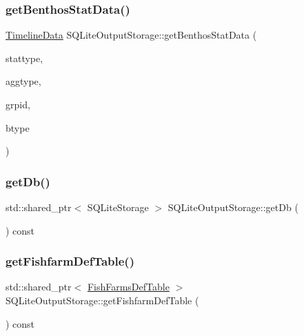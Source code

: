 \mbox{\label{class_s_q_lite_output_storage_aea0e285a8d0b0e3fc9ed095d8daef966}} 
\subsubsection{\texorpdfstring{getBenthosStatData()}{getBenthosStatData()}}
{\footnotesize\ttfamily \mbox{\hyperlink{struct_timeline_data}{Timeline\+Data}} S\+Q\+Lite\+Output\+Storage\+::get\+Benthos\+Stat\+Data (\begin{DoxyParamCaption}\item[{\mbox{\hyperlink{namespacedisplace_1_1plot_a3a91ceda6f3e5855d0e7cf97e8dea045}{displace\+::plot\+::\+Benthos\+Stat}}}]{stattype,  }\item[{\mbox{\hyperlink{namespacedisplace_1_1plot_a522cdc3da3faefae0803944b866e0c3d}{displace\+::plot\+::\+Aggregation\+Type}}}]{aggtype,  }\item[{int}]{grpid,  }\item[{const std\+::vector$<$ int $>$ \&}]{btype }\end{DoxyParamCaption})}

\mbox{\label{class_s_q_lite_output_storage_a0a4e7c7bdbb73b59a28991657768aa79}} 
\subsubsection{\texorpdfstring{getDb()}{getDb()}}
{\footnotesize\ttfamily std\+::shared\+\_\+ptr$<$ S\+Q\+Lite\+Storage $>$ S\+Q\+Lite\+Output\+Storage\+::get\+Db (\begin{DoxyParamCaption}{ }\end{DoxyParamCaption}) const}

\mbox{\label{class_s_q_lite_output_storage_a936436b2b0a76fa889c1193bc302c236}} 
\subsubsection{\texorpdfstring{getFishfarmDefTable()}{getFishfarmDefTable()}}
{\footnotesize\ttfamily std\+::shared\+\_\+ptr$<$ \mbox{\hyperlink{class_fish_farms_def_table}{Fish\+Farms\+Def\+Table}} $>$ S\+Q\+Lite\+Output\+Storage\+::get\+Fishfarm\+Def\+Table (\begin{DoxyParamCaption}{ }\end{DoxyParamCaption}) const}

